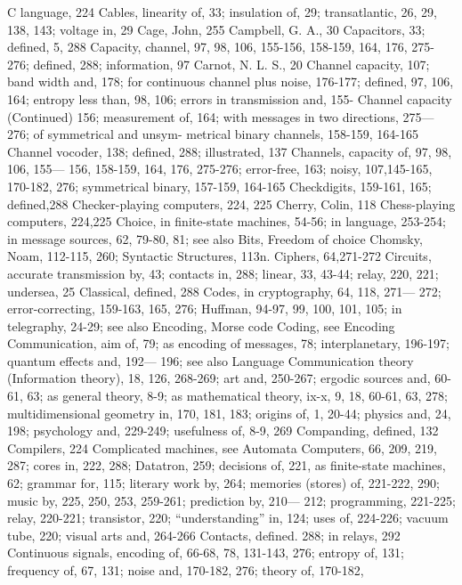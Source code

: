 {{{{{{{{{{{{{{{C language, 224
Cables, linearity of, 33; insulation of, 29;
transatlantic, 26, 29, 138, 143;
voltage in, 29
Cage, John, 255
Campbell, G. A., 30
Capacitors, 33; defined, 5, 288
Capacity, channel, 97, 98, 106, 155-156,
158-159, 164, 176, 275-276; defined,
288; information, 97
Carnot, N. L. S., 20
Channel capacity, 107; band width and,
178; for continuous channel plus
noise, 176-177; defined, 97, 106,
164; entropy less than, 98, 106;
errors in transmission and, 155-
Channel capacity (Continued)
156; measurement of, 164; with
messages in two directions, 275—
276; of symmetrical and unsym-
metrical binary channels, 158-159,
164-165
Channel vocoder, 138; defined, 288;
illustrated, 137
Channels, capacity of, 97, 98, 106, 155—
156, 158-159, 164, 176, 275-276;
error-free, 163; noisy, 107,145-165,
170-182, 276; symmetrical binary,
157-159, 164-165
Checkdigits, 159-161, 165; defined,288
Checker-playing computers, 224, 225
Cherry, Colin, 118
Chess-playing computers, 224,225
Choice, in finite-state machines, 54-56;
in language, 253-254; in message
sources, 62, 79-80, 81; see also
Bits, Freedom of choice
Chomsky, Noam, 112-115, 260; Syntactic
Structures, 113n.
Ciphers, 64,271-272
Circuits, accurate transmission by, 43;
contacts in, 288; linear, 33, 43-44;
relay, 220, 221; undersea, 25
Classical, defined, 288
Codes, in cryptography, 64, 118, 271—
272; error-correcting, 159-163, 165,
276; Huffman, 94-97, 99, 100, 101,
105; in telegraphy, 24-29; see also
Encoding, Morse code
Coding, see Encoding
Communication, aim of, 79; as encoding
of messages, 78; interplanetary,
196-197; quantum effects and, 192—
196; see also Language
Communication theory (Information
theory), 18, 126, 268-269; art and,
250-267; ergodic sources and, 60-
61, 63; as general theory, 8-9; as
mathematical theory, ix-x, 9, 18,
60-61, 63, 278; multidimensional
geometry in, 170, 181, 183; origins
of, 1, 20-44; physics and, 24, 198;
psychology and, 229-249; usefulness
of, 8-9, 269
Companding, defined, 132
Compilers, 224
Complicated machines, see Automata
Computers, 66, 209, 219, 287; cores in,
222, 288; Datatron, 259; decisions
of, 221, as finite-state machines,
62; grammar for, 115; literary
work by, 264; memories (stores) of,
221-222, 290; music by, 225, 250,
253, 259-261; prediction by, 210—
212; programming, 221-225; relay,
220-221; transistor, 220; “understanding”
in, 124; uses of, 224-226;
vacuum tube, 220; visual arts and,
264-266
Contacts, defined. 288; in relays, 292
Continuous signals, encoding of, 66-68,
78, 131-143, 276; entropy of, 131;
frequency of, 67, 131; noise and,
170-182, 276; theory of, 170-182,
}}}}}}}}}}}}}}}

